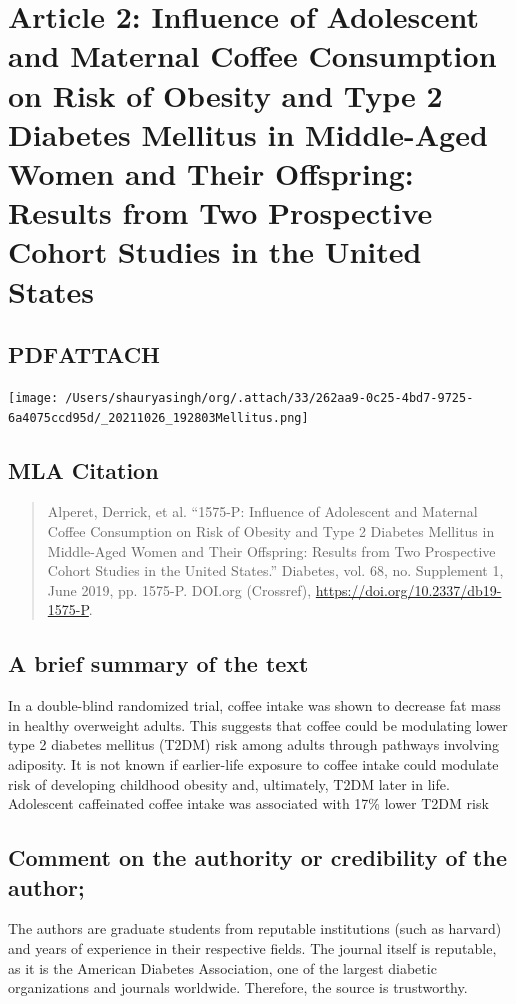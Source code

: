 \documentclass{scrartcl}
\begin{document}
\section{Article 2: Influence of Adolescent and Maternal Coffee Consumption on Risk of Obesity and Type 2 Diabetes Mellitus in Middle-Aged Women and Their Offspring: Results from Two Prospective Cohort Studies in the United States}
\label{sec:orgdab8b7f}
\subsection{PDF\hfill{}\textsc{ATTACH}}
\label{sec:orgb153ab8}
\begin{center}
\texttt{[image: /Users/shauryasingh/org/.attach/33/262aa9-0c25-4bd7-9725-6a4075ccd95d/\_20211026\_192803Mellitus.png]}
\end{center}

\subsection{MLA Citation}
\label{sec:org6a78a88}
\begin{quote}
Alperet, Derrick, et al. “1575-P: Influence of Adolescent and Maternal Coffee Consumption on Risk of Obesity and Type 2 Diabetes Mellitus in Middle-Aged Women and Their Offspring: Results from Two Prospective Cohort Studies in the United States.” Diabetes, vol. 68, no. Supplement 1, June 2019, pp. 1575-P. DOI.org (Crossref), \url{https://doi.org/10.2337/db19-1575-P}.
\end{quote}
\subsection{A brief summary of the text}
\label{sec:org20180ba}
In a double-blind randomized trial, coffee intake was shown to decrease fat mass in healthy overweight adults. This suggests that coffee could be modulating lower type 2 diabetes mellitus (T2DM) risk among adults through pathways involving adiposity. It is not known if earlier-life exposure to coffee intake could modulate risk of developing childhood obesity and, ultimately, T2DM later in life. Adolescent caffeinated coffee intake was associated with 17\% lower T2DM risk
\subsection{Comment on the authority or credibility of the author;}
\label{sec:org9cdb703}
The authors are graduate students from reputable institutions (such as harvard) and years of experience in their respective fields. The journal itself is reputable, as it is the American Diabetes Association, one of the largest diabetic organizations and journals worldwide. Therefore, the source is trustworthy.
\end{document}
